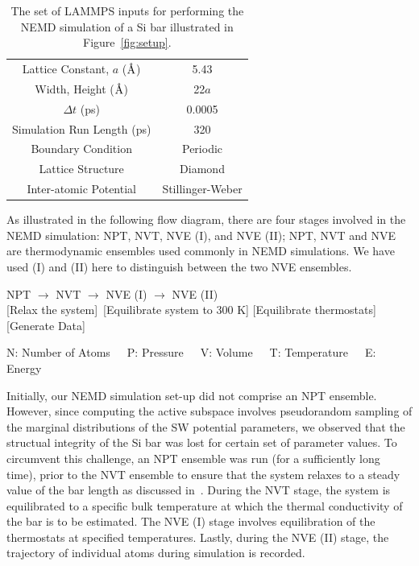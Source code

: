 \begin{table}[htbp]
\centering
{}
\begin{tabular}{@{}cc@{}}\toprule
Lattice Constant, $a$ ($\mbox{\normalfont\AA}$) & 5.43 \\ 
Width, Height ($\mbox{\normalfont\AA}$) & 22$a$ \\
$\Delta t$  (ps) & 0.0005 \\ 
Simulation Run Length (ps) & 320 \\ 
Boundary Condition & Periodic \\ 
Lattice Structure & Diamond \\
Inter-atomic Potential & Stillinger-Weber \\ 
\bottomrule
\end{tabular}
\caption{The set of LAMMPS inputs for performing the NEMD simulation of a Si bar illustrated in Figure~\ref{fig:setup}.}
\label{tab:input}
\end{table}
 
As illustrated in the following flow diagram, there are four stages involved in the NEMD simulation: 
NPT, NVT, NVE (I), and
NVE (II); NPT, NVT and NVE are thermodynamic ensembles used commonly in NEMD simulations. We have used
(I) and (II) here to distinguish between the two NVE ensembles. 
%
\begin{center}

NPT \hspace{5mm} $\rightarrow$ \hspace{5mm} NVT \hspace{5mm} $\rightarrow$ \hspace{5mm} NVE (I) \hspace{5mm}
$\rightarrow$ \hspace{5mm} NVE (II)
\\ \vspace{1mm}
\tiny [Relax the system]~[Equilibrate system to 300 K] \hspace{1mm} [Equilibrate thermostats] \hspace{4mm}
 [Generate Data]
\\ \vspace{1mm}

\tiny{N: Number of Atoms~~~P: Pressure~~~V: Volume~~~T: Temperature~~~E: Energy}
\end{center}

%
Initially, our NEMD simulation set-up did not comprise an NPT ensemble. However,
since computing the active subspace involves pseudorandom sampling of the marginal distributions
of the SW potential parameters, we observed that the structual integrity of the Si bar was lost for
certain set of parameter values. To circumvent this challenge, an NPT ensemble was run
(for a sufficiently long time), prior to the NVT ensemble to ensure that the system relaxes to a 
steady value of the bar length as discussed in~\cite{Vohra:2018a}.
During the NVT stage, the system is equilibrated to a specific bulk temperature at which the thermal
conductivity of the bar is to be estimated. The NVE (I) stage involves equilibration of the thermostats
at specified temperatures. Lastly, during the NVE (II) stage, the trajectory of individual atoms during
simulation is recorded.

